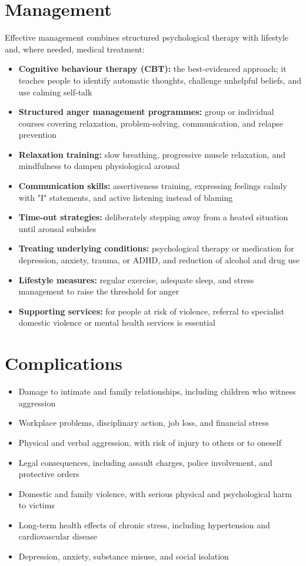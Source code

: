 \section*{Management}
Effective management combines structured psychological therapy with lifestyle and, where needed, medical treatment:

\begin{itemize}
    \item \textbf{Cognitive behaviour therapy (CBT):} the best-evidenced approach; it teaches people to identify automatic thoughts, challenge unhelpful beliefs, and use calming self-talk
    \item \textbf{Structured anger management programmes:} group or individual courses covering relaxation, problem-solving, communication, and relapse prevention
    \item \textbf{Relaxation training:} slow breathing, progressive muscle relaxation, and mindfulness to dampen physiological arousal
    \item \textbf{Communication skills:} assertiveness training, expressing feelings calmly with "I" statements, and active listening instead of blaming
    \item \textbf{Time-out strategies:} deliberately stepping away from a heated situation until arousal subsides
    \item \textbf{Treating underlying conditions:} psychological therapy or medication for depression, anxiety, trauma, or ADHD, and reduction of alcohol and drug use
    \item \textbf{Lifestyle measures:} regular exercise, adequate sleep, and stress management to raise the threshold for anger
    \item \textbf{Supporting services:} for people at risk of violence, referral to specialist domestic violence or mental health services is essential
\end{itemize}

\section*{Complications}
\begin{itemize}
    \item Damage to intimate and family relationships, including children who witness aggression
    \item Workplace problems, disciplinary action, job loss, and financial stress
    \item Physical and verbal aggression, with risk of injury to others or to oneself
    \item Legal consequences, including assault charges, police involvement, and protective orders
    \item Domestic and family violence, with serious physical and psychological harm to victims
    \item Long-term health effects of chronic stress, including hypertension and cardiovascular disease
    \item Depression, anxiety, substance misuse, and social isolation
\end{itemize}

